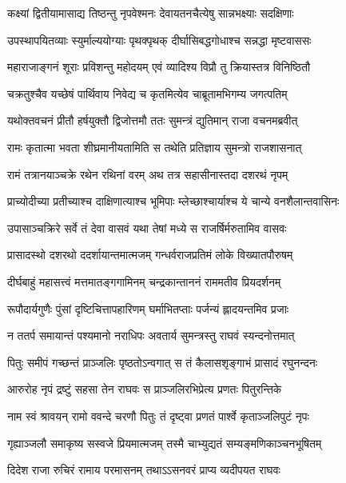 \twolineshloka
{कक्ष्यां द्वितीयामासाद्य तिष्ठन्तु नृपवेश्मनः}
{देवायतनचैत्येषु सान्नभक्ष्याः सदक्षिणाः} %

\twolineshloka
{उपस्थापयितव्याः स्युर्माल्ययोग्याः पृथक्पृथक्}
{दीर्घासिबद्धगोधाश्च सन्नद्धा मृष्टवाससः} %

\twolineshloka
{महाराजाङ्गनं शूराः प्रविशन्तु महोदयम्}
{एवं व्यादिश्य विप्रौ तु क्रियास्तत्र विनिष्ठितौ} %

\twolineshloka
{चक्रतुश्चैव यच्छेषं पार्थिवाय निवेद्य च}
{कृतमित्येव चाब्रूतामभिगम्य जगत्पतिम्} %

\twolineshloka
{यथोक्तवचनं प्रीतौ हर्षयुक्तौ द्विजोत्तमौ}
{ततः सुमन्त्रं द्युतिमान् राजा वचनमब्रवीत्} %

\twolineshloka
{रामः कृतात्मा भवता शीघ्रमानीयतामिति}
{स तथेति प्रतिज्ञाय सुमन्त्रो राजशासनात्} %

\twolineshloka
{रामं तत्रानयाञ्चक्रे रथेन रथिनां वरम्}
{अथ तत्र सहासीनास्तदा दशरथं नृपम्} %

\twolineshloka
{प्राच्योदीच्या प्रतीच्याश्च दाक्षिणात्याश्च भूमिपाः}
{म्लेच्छाश्चार्याश्च ये चान्ये वनशैलान्तवासिनः} %

\twolineshloka
{उपासाञ्चक्रिरे सर्वे तं देवा वासवं यथा}
{तेषां मध्ये स राजर्षिर्मरुतामिव वासवः} %

\twolineshloka
{प्रासादस्थो दशरथो ददर्शायान्तमात्मजम्}
{गन्धर्वराजप्रतिमं लोके विख्यातपौरुषम्} %

\twolineshloka
{दीर्घबाहुं महासत्त्वं मत्तमातङ्गगामिनम्}
{चन्द्रकान्ताननं राममतीव प्रियदर्शनम्} %

\twolineshloka
{रूपौदार्यगुणैः पुंसां दृष्टिचित्तापहारिणम्}
{घर्माभितप्ताः पर्जन्यं ह्लादयन्तमिव प्रजाः} %

\twolineshloka
{न ततर्प समायान्तं पश्यमानो नराधिपः}
{अवतार्य सुमन्त्रस्तु राघवं स्यन्दनोत्तमात्} %

\twolineshloka
{पितुः समीपं गच्छन्तं प्राञ्जलिः पृष्ठतोऽन्वगात्}
{स तं कैलासशृङ्गाभं प्रासादं रघुनन्दनः} %

\twolineshloka
{आरुरोह नृपं द्रष्टुं सहसा तेन राघवः}
{स प्राञ्जलिरभिप्रेत्य प्रणतः पितुरन्तिके} %

\twolineshloka
{नाम स्वं श्रावयन् रामो ववन्दे चरणौ पितुः}
{तं दृष्ट्वा प्रणतं पार्श्वे कृताञ्जलिपुटं नृपः} %

\twolineshloka
{गृह्याञ्जलौ समाकृष्य सस्वजे प्रियमात्मजम्}
{तस्मै चाभ्युद्यतं सम्यङ्मणिकाञ्चनभूषितम्} %

\twolineshloka
{दिदेश राजा रुचिरं रामाय परमासनम्}
{तथाऽऽसनवरं प्राप्य व्यदीपयत राघवः} %

